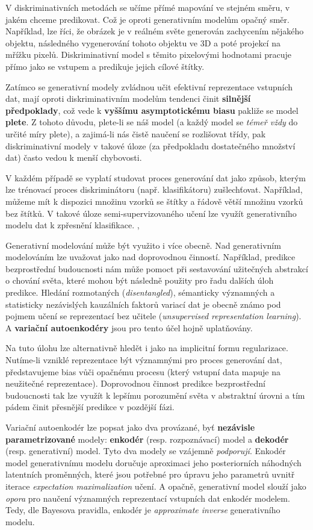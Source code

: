 V diskriminativních metodách se učíme přímé mapování ve stejném směru, v jakém chceme predikovat.
Což je oproti generativním modelům opačný směr. Například, lze říci,
že obrázek je v reálném světe generován zachycením nějakého objektu, následného vygenerování tohoto objektu ve 3D a poté projekcí na mřížku pixelů.
Diskriminativní model s těmito pixelovými hodnotami pracuje přímo jako se vstupem a predikuje jejich cílové štítky.

Zatímco se generativní modely zvládnou učit efektivní reprezentace vstupních dat, mají oproti diskriminativním modelům tendenci činit \textbf{silnější předpoklady}, což vede k \textbf{vyššímu asymptotickému biasu} pakliže se model \textbf{plete}. \cite{Banerjee2007}
Z tohoto důvodu, plete-li se náš model (a každý model se \emph{témeř vždy} do určité míry plete), a zajimá-li nás čistě naučení se rozlišovat třídy, pak diskriminativní modely v takové úloze (za předpokladu dostatečného množství dat) často vedou k menší chybovosti.

V každém případě se vyplatí studovat proces generování dat jako způsob, kterým lze trénovací proces diskriminátoru (např. klasifikátoru) zušlechťovat.
Například, můžeme mít k dispozici množinu vzorků se štítky a řádově větší množinu vzorků bez štítků.
V takové úloze semi-supervizovaného učení lze využít generativního modelu dat k zpřesnění klasifikace. \cite{Kingma2014}, \cite{Soenderby2016}

Generativní modelování může být využito i více obecně. Nad generativním modelováním lze uvažovat jako nad doprovodnou činností.
Například, predikce bezprostřední budoucnosti nám může pomoct při sestavování užitečných abstrakcí o chování světa, které mohou být následně použity pro řadu dalších úloh predikce.
Hledání rozmotaných (\emph{disentangled}), sémanticky významných a statisticky nezávislých kauzálních faktorů variací dat je obecně známo pod pojmem učení se reprezentací bez učitele (\emph{unsupervised representation learning}).
A \textbf{variační autoenkodéry} jsou pro tento účel hojně uplatňovány.

Na tuto úlohu lze alternativně hledět i jako na implicitní formu regularizace. Nutíme-li vzniklé reprezentace být významnými pro proces generování dat, představujeme bias vůči opačnému procesu (který vstupní data mapuje na neužitečné reprezentace).
Doprovodnou činnost predikce bezprostřední budoucnosti tak lze využít k lepšímu porozumění světa v abstraktní úrovni a tím pádem činit přesnější predikce v pozdější fázi.

Variační autoenkodér lze popsat jako dva provázané, byť \textbf{nezávisle parametrizované} modely: \textbf{enkodér} (resp. rozpoznávací) model a \textbf{dekodér} (resp. generativní) model.
Tyto dva modely se vzájemně \emph{podporují}. Enkodér model generativnímu modelu doručuje aproximaci jeho posteriorních náhodných latentních proměnných,
které jsou potřebné pro úpravu jeho parametrů uvnitř iterace \emph{expectation maximalization} učení.
A opačně, generativní model slouží jako \emph{opora} pro naučení významných reprezentací vstupních dat enkodér modelem.
Tedy, dle Bayesova pravidla, enkodér je \emph{approximate inverse} generativního modelu.

